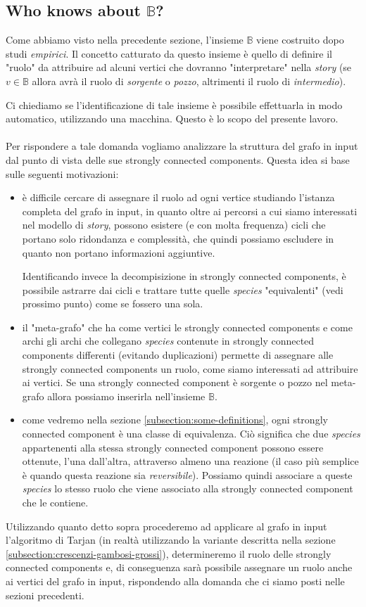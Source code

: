 \subsection{Who knows about $\mathbb{B}$?}
Come abbiamo visto nella precedente sezione, l'insieme $\mathbb{B}$
viene costruito dopo studi \emph{empirici}. Il concetto catturato da
questo insieme \`e quello di definire il "ruolo" da attribuire ad
alcuni vertici che dovranno "interpretare" nella \emph{story} (se $v
\in \mathbb{B}$ allora avr\`a il ruolo di \emph{sorgente} o
\emph{pozzo}, altrimenti il ruolo di \emph{intermedio}).

Ci chiediamo se l'identificazione di tale insieme \`e possibile
effettuarla in modo automatico, utilizzando una macchina. Questo \`e
lo scopo del presente lavoro.
\\\\
Per rispondere a tale domanda vogliamo analizzare la struttura del
grafo in input dal punto di vista delle sue strongly connected
components. Questa idea si base sulle seguenti motivazioni:
\begin{itemize}
\item \`e difficile cercare di assegnare il ruolo ad ogni vertice
  studiando l'istanza completa del grafo in input, in quanto oltre ai
  percorsi a cui siamo interessati nel modello di \emph{story},
  possono esistere (e con molta frequenza) cicli che portano solo
  ridondanza e complessit\`a, che quindi possiamo escludere in quanto
  non portano informazioni aggiuntive. 

  Identificando invece la decompisizione in strongly connected
  components, \`e possibile astrarre dai cicli e trattare tutte quelle
  \emph{species} "equivalenti" (vedi prossimo punto) come se fossero
  una sola.
\item il "meta-grafo" che ha come vertici le strongly connected
  components e come archi gli archi che collegano \emph{species}
  contenute in strongly connected components differenti (evitando
  duplicazioni) permette di assegnare alle strongly connected
  components un ruolo, come siamo interessati ad attribuire ai
  vertici. Se una strongly connected component \`e sorgente o pozzo
  nel meta-grafo allora possiamo inserirla nell'insieme $\mathbb{B}$.
\item come vedremo nella sezione \ref{subsection:some-definitions},
  ogni strongly connected component \`e una classe di
  equivalenza. Ci\`o significa che due \emph{species} appartenenti
  alla stessa strongly connected component possono essere ottenute,
  l'una dall'altra, attraverso almeno una reazione (il caso pi\`u
  semplice \`e quando questa reazione sia
  \emph{reversibile}). Possiamo quindi associare a queste
  \emph{species} lo stesso ruolo che viene associato alla strongly
  connected component che le contiene.
\end{itemize}
Utilizzando quanto detto sopra procederemo ad applicare al grafo in
input l'algoritmo di Tarjan (in realt\`a utilizzando la variante
descritta nella sezione \ref{subsection:crescenzi-gambosi-grossi}),
determineremo il ruolo delle strongly connected components e, di
conseguenza sar\`a possibile assegnare un ruolo anche ai vertici del
grafo in input, rispondendo alla domanda che ci siamo posti nelle
sezioni precedenti.

